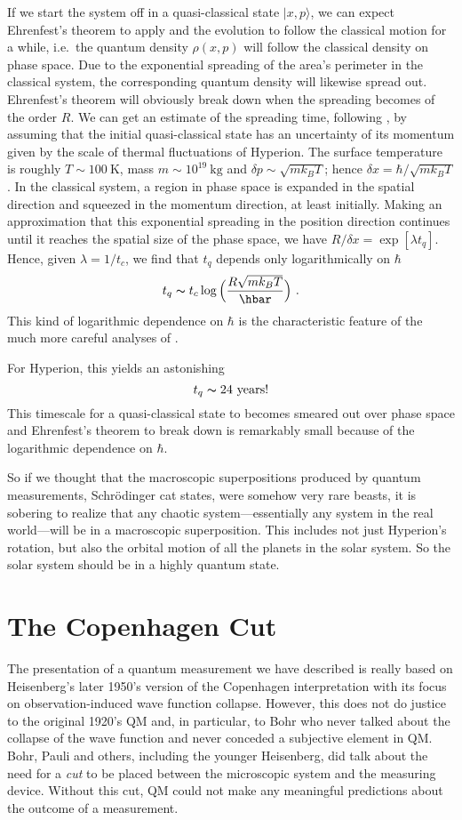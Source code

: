 \documentclass[12pt]{article}
\theoremstyle{plain}
\theoremstyle{definition}
\theoremstyle{remark}
\def\ket#1{| #1\rangle}
\newcommand{\EQ}[1]{\begin{equation}\begin{split} #1
\end{split}\end{equation}}
\begin{document}
If we start the system off in a quasi-classical state $\ket{x,p}$, we can expect Ehrenfest's theorem to apply and the evolution to follow the classical motion for a while, i.e.~the quantum density $\rho(x,p)$ will follow the classical density on phase space. Due to the exponential spreading of the area's perimeter in the classical system, the corresponding quantum density will likewise spread out. Ehrenfest's theorem will obviously break down when the spreading becomes of the order $R$. We can get an estimate of the spreading time, following \cite{Zurek2}, by assuming that the initial quasi-classical state has an uncertainty of its momentum given by the scale of thermal fluctuations of Hyperion. The surface temperature is roughly $T\sim100\ \text{K}$, mass $m\sim10^{19}\ \text{kg}$ and $\delta p\sim\sqrt{mk_BT}$; hence $\delta x=\hbar/\sqrt{mk_BT}$. In the classical system, a region in phase space is expanded  in the spatial direction and squeezed in the momentum direction, at least initially. Making an approximation that this exponential spreading in the position direction continues until it reaches the spatial size of the phase space, we have
$R/\delta x=\exp[\lambda t_q]$. Hence, given $\lambda=1/t_c$, we find that $t_q$ depends only logarithmically on $\hbar$
\EQ{
t_q\thicksim t_c\log\Big(\frac{R\sqrt{mk_BT}}\hbar\Big)\ .
}
This kind of logarithmic dependence on $\hbar$ is the characteristic feature of the much more careful analyses of \cite{BZ,BB,Zurek2}.

For Hyperion, this yields an astonishing
\[
t_q\thicksim 24\ \text{years}!
\]
This timescale for a quasi-classical state to becomes smeared out over phase space and Ehrenfest's theorem to break down is remarkably small because of the logarithmic dependence on $\hbar$.

So if we thought that the macroscopic superpositions produced by quantum measurements, Schr\"odinger cat states, were somehow very rare beasts, it is sobering to realize that any chaotic system---essentially any system in the real world---will be in a macroscopic superposition. This includes not just Hyperion's rotation, but also the orbital motion of all the planets in the solar system. So the solar system should be in a highly quantum state.

\section{The Copenhagen Cut}\label{s4}

The presentation of a quantum measurement we have described is really based on Heisenberg's later
1950's version of the Copenhagen interpretation with its focus on observation-induced wave function collapse. However, this does not do justice to the original 1920's QM and, in particular, to Bohr who never talked about the collapse of the wave function and never conceded a subjective element in QM. Bohr, Pauli and others, including the younger Heisenberg, did talk about the need for a {\it cut\/} to be placed between the microscopic system and the measuring device. Without this cut, QM could not make any meaningful predictions about the outcome of a measurement. 
\end{document}
